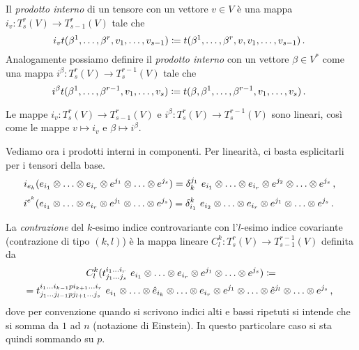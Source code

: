 \begin{definition} 
	Il \emph{prodotto interno} di un tensore con un vettore $v\in V$  è una mappa $i_v:T_s^r(V)\to T_{s-1}^r(V)$ tale che
	\begin{equation*}
		i_vt(\beta^1,\ldots,\beta^r,v_1,\ldots,v_{s-1}) \coloneqq t(\beta^1,\ldots,\beta^r,v,v_1,\ldots,v_{s-1})\, \text{. }
	\end{equation*}
	Analogamente possiamo definire il \emph{prodotto interno} con un vettore $\beta \in V^*$ come una mappa $i^\beta:T_s^r(V)\to T_{s}^{r-1}(V)$ tale che
	\begin{equation*}
		i^\beta t(\beta^1,\ldots,\beta^{r-1},v_1,\ldots,v_s) \coloneqq t(\beta,\beta^1,\ldots,\beta^{r-1},v_1,\ldots,v_s)\, \text{. }
	\end{equation*}
\end{definition}

\begin{remark}
	Le mappe $i_v:T_s^r(V)\to T_{s-1}^r(V)$ e $i^\beta:T_s^r(V)\to T_s^{r-1}(V)$ sono lineari, così come le mappe $v\mapsto i_v$ e $\beta\mapsto i^\beta$.
\end{remark}

Vediamo ora i prodotti interni in componenti. Per linearità, ci basta esplicitarli per i tensori della base.
\begin{equation*}
	i_{e_k} (e_{i_1}\otimes \ldots \otimes e_{i_r}\otimes e^{j_1}\otimes \ldots\otimes e^{j_s}) = \delta_k^{j_1}\ e_{i_1}\otimes \ldots \otimes e_{i_r}\otimes e^{j_2}\otimes \ldots\otimes e^{j_s}\virgola
\end{equation*}
\begin{equation*}
	i^{e^k} (e_{i_1}\otimes \ldots \otimes e_{i_r}\otimes e^{j_1}\otimes \ldots\otimes e^{j_s}) = \delta_{i_1}^k\ e_{i_2}\otimes \ldots \otimes e_{i_r}\otimes e^{j_1}\otimes \ldots\otimes e^{j_s}\punto
\end{equation*}

\begin{definition} 
	La \emph{contrazione} del $k$-esimo indice controvariante con l'$l$-esimo indice covariante (contrazione di tipo $(k,l)$) è la mappa lineare $C_l^k:T_s^r(V)\to T_{s-1}^{r-1}(V)$ definita da 
	\begin{multline*}
		C_l^k(t_{j_1\ldots j_s}^{i_1\ldots i_r}\ e_{i_1}\otimes \ldots \otimes e_{i_r}\otimes e^{j_1}\otimes \ldots\otimes e^{j_s}) \coloneqq\\
		=t_{j_1\ldots j_{l-1}pj_{l+1}\ldots j_s}^{i_1\ldots i_{k-1}pi_{k+1}\ldots i_r}\ e_{i_1}\otimes \ldots \otimes\hat e_{i_k}\otimes \ldots\otimes e_{i_r}\otimes e^{j_1}\otimes \ldots\otimes \hat e^{j_l}\otimes \ldots \otimes e^{j_s} \, \text{, }
	\end{multline*}
	dove per convenzione quando si scrivono indici alti e bassi ripetuti si intende che si somma da $1$ ad $n$ (notazione di Einstein). In questo particolare caso si sta quindi sommando su $p$.
\end{definition}

